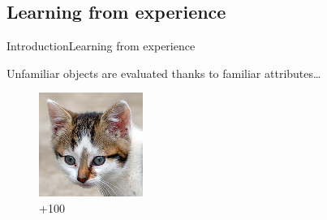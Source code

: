 \subsection{Learning from experience}
\begin{frame}{Introduction}{Learning from experience}

Unfamiliar objects are evaluated thanks to familiar attributes\ldots

\vspace{0.5cm}

\begin{figure}[ht]
\begin{minipage}[b]{0.20\linewidth}
\centering
\includegraphics[width=\textwidth]{img/introduction/kitten.png}
\\{\color{green}+100}
\end{minipage}
\hspace{0.1cm}
\begin{minipage}[b]{0.20\linewidth}
\centering

\end{minipage}
\end{figure}
\end{frame}
